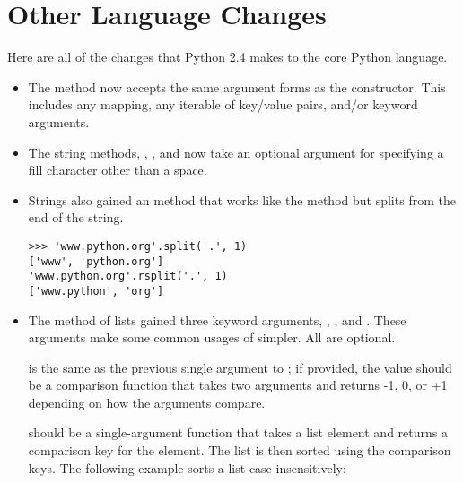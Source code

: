 \documentclass{howto}
\begin{document}
\begin{seealso}

\end{seealso}


\section{Other Language Changes}

Here are all of the changes that Python 2.4 makes to the core Python
language.

\begin{itemize}

\item The  method now accepts the same
argument forms as the  constructor.  This includes any
mapping, any iterable of key/value pairs, and/or keyword arguments.       

\item The string methods, , , and
 now take an optional argument for specifying a
fill character other than a space.

\item Strings also gained an  method that
works like the  method but splits from the end of
the string.  

\begin{verbatim}
>>> 'www.python.org'.split('.', 1)
['www', 'python.org']
'www.python.org'.rsplit('.', 1)
['www.python', 'org']        
\end{verbatim}      

\item The  method of lists gained three keyword
arguments, , , and .  These arguments
make some common usages of  simpler.  All are optional.

 is the same as the previous single argument to
; if provided, the value should be a comparison
function that takes two arguments and returns -1, 0, or +1 depending
on how the arguments compare.  

 should be a single-argument function that takes a list
element and returns a comparison key for the element.  The list is
then sorted using the comparison keys.  The following example sorts a
list case-insensitively:


\end{itemize}
\end{document}
